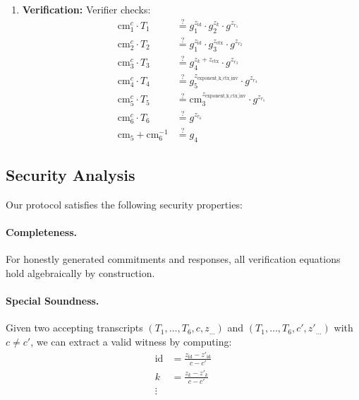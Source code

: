 \begin{protocol}
\begin{enumerate}
    \item \textbf{Verification:} Verifier checks:
    \begin{align}
        \text{cm}_1^c \cdot T_1 &\stackrel{?}{=} g_1^{z_{\text{id}}} \cdot g_2^{z_{k}} \cdot g^{z_{r_1}} \\
        \text{cm}_2^c \cdot T_2 &\stackrel{?}{=} g_1^{z_{\text{id}}} \cdot g_3^{z_{\text{ctx}}} \cdot g^{z_{r_2}} \\
        \text{cm}_3^c \cdot T_3 &\stackrel{?}{=} g_4^{z_{k} + z_{\text{ctx}}} \cdot g^{z_{r_3}} \\
        \text{cm}_4^c \cdot T_4 &\stackrel{?}{=} g_5^{z_{\text{exponent\_k\_ctx\_inv}}} \cdot g^{z_{r_4}} \\
        \text{cm}_5^c \cdot T_5 &\stackrel{?}{=} \text{cm}_3^{z_{\text{exponent\_k\_ctx\_inv}}} \cdot g^{z_{r_5}} \\
        \text{cm}_6^c \cdot T_6 &\stackrel{?}{=} g^{z_{r_6}} \\
        \text{cm}_5 + \text{cm}_6^{-1} &\stackrel{?}{=} g_4
    \end{align}
\end{enumerate}
\end{protocol}

\subsection{Security Analysis}

Our protocol satisfies the following security properties:

\paragraph{Completeness.} For honestly generated commitments and responses, all verification equations hold algebraically by construction.

\paragraph{Special Soundness.} Given two accepting transcripts $(T_1,\ldots,T_6,c,z_{\ldots})$ and $(T_1,\ldots,T_6,c',z'_{\ldots})$ with $c \neq c'$, we can extract a valid witness by computing:
\begin{align}
\text{id} &= \frac{z_{\text{id}} - z'_{\text{id}}}{c - c'} \\
k &= \frac{z_{k} - z'_{k}}{c - c'} \\
\vdots
\end{align}

